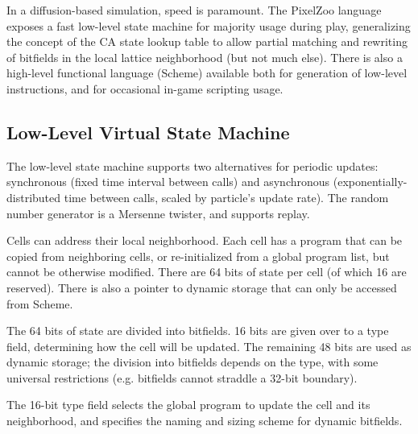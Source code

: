 \documentclass{acm_proc_article-sp}
\begin{document}
In a diffusion-based simulation, speed is paramount.
The PixelZoo language exposes a fast low-level state machine for majority usage during play,
generalizing the concept of the CA state lookup table to allow partial matching
and rewriting of bitfields in the local lattice neighborhood (but not much else).
There is also a high-level functional language (Scheme) available both for generation of low-level instructions,
and for occasional in-game scripting usage.

\subsection{Low-Level Virtual State Machine}

The low-level state machine supports two alternatives for periodic updates:
synchronous (fixed time interval between calls)
and asynchronous (exponentially-distributed time between calls, scaled by particle's update rate).
The random number generator is a Mersenne twister, and supports replay.

Cells can address their local neighborhood.
Each cell has a program that can be copied from neighboring cells, or re-initialized from a global program list,
but cannot be otherwise modified.
There are 64 bits of state per cell (of which 16 are reserved).
There is also a pointer to dynamic storage that can only be accessed from Scheme.

The 64 bits of state are divided into bitfields.
16 bits are given over to a type field, determining how the cell will be updated.
The remaining 48 bits are used as dynamic storage; the division into bitfields depends on the type,
with some universal restrictions (e.g. bitfields cannot straddle a 32-bit boundary).

The 16-bit type field selects the global program to update the cell and its neighborhood,
and specifies the naming and sizing scheme for dynamic bitfields.
\end{document}
